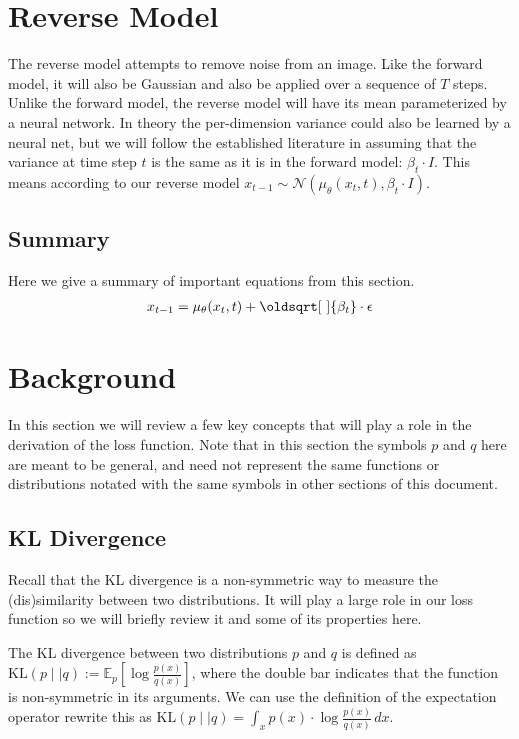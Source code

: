 \documentclass[11pt,dvipsnames]{article}
\renewcommand*{\sqrt}[2][\ ]{\oldsqrt[#1]{#2}}
\begin{document}
\section{Reverse Model}
The reverse model attempts to remove noise from an image.
Like the forward model, it will also be Gaussian and also be applied over
a sequence of $T$ steps. 
Unlike the forward model, the reverse model will have its mean parameterized
by a neural network. In theory the per-dimension variance could also be learned
by a neural net, but we will follow the established literature in assuming that
the variance at time step $t$ is the same as it is in the forward model: $\beta_t \cdot I$.
This means according to our reverse model $x_{t - 1} \sim \mathcal{N}(\mu_\theta(x_t, t), \beta_t \cdot I)$.

\subsection{Summary}
Here we give a summary of important equations from this section.
\begin{equation*}
\begin{split}
x_{t-1} = \mu_\theta(x_t, t) + \sqrt{\beta_t} \cdot \epsilon \\
\end{split}
\end{equation*}

\section{Background}
In this section we will review a few key concepts that will play a role in the derivation of the loss function.
Note that in this section the symbols $p$ and $q$ here are meant to be general, and need not represent the same
functions or distributions notated with the same symbols in other sections of this document.

\subsection{KL Divergence}
Recall that the KL divergence is a non-symmetric way to measure the (dis)similarity between
two distributions. It will play a large role in our loss function so we will briefly review it
and some of its properties here.

The KL divergence between two distributions $p$ and $q$
is defined as $\text{KL}(p \mid\mid q) := \mathbb{E}_p \left[\log \frac{p(x)}{q(x)}\right]$, where the double bar
indicates that the function is non-symmetric in its arguments. We can use the definition
of the expectation operator rewrite this as $\text{KL}(p \mid\mid q) = \int_x p(x) \cdot \log \frac{p(x)}{q(x)} \,dx$.
\end{document}
